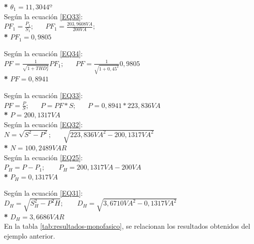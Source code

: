 \textbf{* }$\theta_{1} = 11,3044º$\\

Según la ecuación \ref{EQ33}: \\

$PF_{1} = \frac{P_{1}}{S_{1}}; \;\;\;\;\;\; PF_{1} = \frac{203,9608VA}{200VA};$\\

\textbf{* }$PF_{1} = 0,9805$

Según la ecuación \ref{EQ34}: \\

$PF=\frac{1}{\sqrt{1+THD^2_{I}}}PF_{1}; \;\;\;\;\;\; PF=\frac{1}{\sqrt{1+0,45^2}}0,9805$ \\

\textbf{* } $PF= 0,8941$

Según la ecuación \ref{EQ33}: \\

$PF= \frac{P}{S}; \;\;\;\;\;\; P = PF * S; \;\;\;\;\;\; P = 0,8941 * 223,836 VA$\\

\textbf{* } $P = 200,1317VA$ \\

Según la ecuación \ref{EQ32}: \\

$N=\sqrt{S^2-P^2}; \;\;\;\;\;\; \sqrt{223,836VA^2-200,1317VA^2}$\\

\textbf{* }$N = 100,2489 VAR$\\

Según la ecuación \ref{EQ25}: \\

$P_{H} = P - P_{1}; \;\;\;\;\;\;\; P_{H} = 200,1317VA - 200VA$\\

\textbf{* }$P_{H} = 0,1317VA$

Según la ecuación \ref{EQ31}: \\

$D_{H}=\sqrt{S^2_{H}-P^2{H}}; \;\;\;\;\;\;\; D_{H} = \sqrt{3,6710VA^2 - 0,1317VA^2}$\\

\textbf{* }$D_{H} = 3,6686VAR$\\

En la tabla \ref{tab:resultados-monofasico}, se relacionan los resultados obtenidos del ejemplo anterior.

